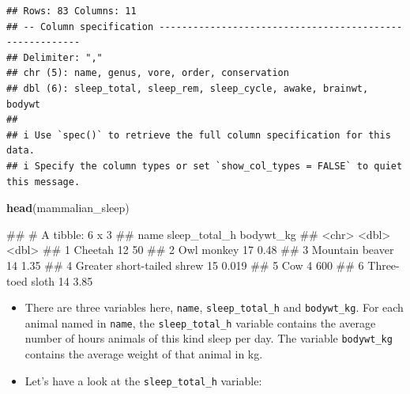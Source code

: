 \documentclass[
]{book}
\newenvironment{Shaded}{\begin{snugshade}}{\end{snugshade}}
\newcommand{\FunctionTok}[1]{\textcolor[rgb]{0.13,0.29,0.53}{\textbf{#1}}}
\newcommand{\NormalTok}[1]{#1}
\newcommand{\SpecialCharTok}[1]{\textcolor[rgb]{0.81,0.36,0.00}{\textbf{#1}}}
\begin{document}
\begin{verbatim}
## Rows: 83 Columns: 11
## -- Column specification --------------------------------------------------------
## Delimiter: ","
## chr (5): name, genus, vore, order, conservation
## dbl (6): sleep_total, sleep_rem, sleep_cycle, awake, brainwt, bodywt
## 
## i Use `spec()` to retrieve the full column specification for this data.
## i Specify the column types or set `show_col_types = FALSE` to quiet this message.
\end{verbatim}

\begin{Shaded}
\begin{Highlighting}[]
\FunctionTok{head}\NormalTok{(mammalian\_sleep)}
\end{Highlighting}
\end{Shaded}

\begin{Shaded}
\begin{Highlighting}[]
\NormalTok{\#\# \# A tibble: 6 x 3}
\NormalTok{\#\#   name                       sleep\_total\_h bodywt\_kg}
\NormalTok{\#\#   \textless{}chr\textgreater{}                              \textless{}dbl\textgreater{}     \textless{}dbl\textgreater{}}
\NormalTok{\#\# 1 Cheetah                               12    50    }
\NormalTok{\#\# 2 Owl monkey                            17     0.48 }
\NormalTok{\#\# 3 Mountain beaver                       14     1.35 }
\NormalTok{\#\# 4 Greater short{-}tailed shrew            15     0.019}
\NormalTok{\#\# 5 Cow                                    4   600    }
\NormalTok{\#\# 6 Three{-}toed sloth                      14     3.85}
\end{Highlighting}
\end{Shaded}

\begin{itemize}
\item
  There are three variables here, \texttt{name}, \texttt{sleep\_total\_h} and \texttt{bodywt\_kg}. For each animal named in \texttt{name}, the \texttt{sleep\_total\_h} variable contains the average number of hours animals of this kind sleep per day. The variable \texttt{bodywt\_kg} contains the average weight of that animal in kg.
\item
  Let's have a look at the \texttt{sleep\_total\_h} variable:
\end{itemize}

\begin{Shaded}
\end{Shaded}
\end{document}
